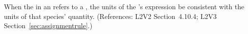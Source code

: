 When the  in an \InitialAssignment refers to a \Species,
the units of the \InitialAssignment's  expression  be
consistent with the units of that species' quantity.  (References:
L2V2 Section~4.10.4; L2V3 Section~\ref{sec:assignmentrule}.)

